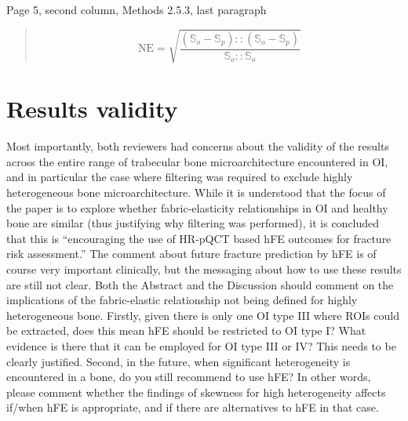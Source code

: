 \documentclass{AR2RC}
\begin{document}
Page 5, second column, Methods 2.5.3, last paragraph
\begin{quote}
	\begin{equation}
	\text{NE} = \sqrt{\frac{(\mathbb{S}_o - \mathbb{S}_p) :: (\mathbb{S}_o - \mathbb{S}_p)}{\mathbb{S}_o :: \mathbb{S}_o}}
	\label{Eq206}
	\end{equation}
	
\end{quote}

\section{Results validity}
\RC Most importantly, both reviewers had concerns about the validity of the results across the entire range of trabecular bone microarchitecture encountered in OI, and in particular the case where filtering was required to exclude highly heterogeneous bone microarchitecture. While it is understood that the focus of the paper is to explore whether fabric-elasticity relationships in OI and healthy bone are similar (thus justifying why filtering was performed), it is concluded that this is “encouraging the use of HR-pQCT based hFE outcomes for fracture risk assessment.” The comment about future fracture prediction by hFE is of course very important clinically, but the messaging about how to use these results are still not clear. Both the Abstract and the Discussion should comment on the implications of the fabric-elastic relationship not being defined for highly heterogeneous bone. Firstly, given there is only one OI type III where ROIs could be extracted, does this mean hFE should be restricted to OI type I? What evidence is there that it can be employed for OI type III or IV? This needs to be clearly justified. Second, in the future, when significant heterogeneity is encountered in a bone, do you still recommend to use hFE? In other words, please comment whether the findings of skewness for high heterogeneity affects if/when hFE is appropriate, and if there are alternatives to hFE in that case.
\end{document}
